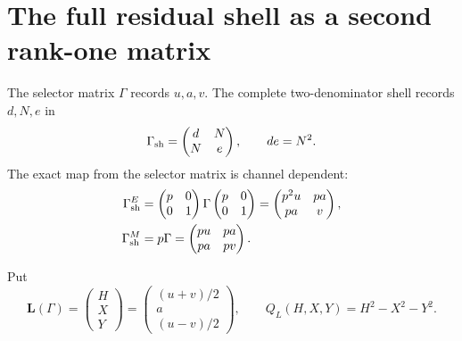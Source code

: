 \documentclass[11pt]{article}
\theoremstyle{definition}
\theoremstyle{remark}
\begin{document}
\section{The full residual shell as a second rank-one matrix}

The selector matrix $\Gamma$ records $u,a,v$.  The complete two-denominator
shell records $d,N,e$ in
\begin{equation}\label{eq:shell-matrix}
 \Gamma_{\rm sh}=\begin{pmatrix}d&N\\N&e\end{pmatrix},
 \qquad de=N^2.
\end{equation}
The exact map from the selector matrix is channel dependent:
\begin{align}
 \Gamma_{\rm sh}^{E}
 &=\begin{pmatrix}p&0\\0&1\end{pmatrix}
   \Gamma
   \begin{pmatrix}p&0\\0&1\end{pmatrix}
 =\begin{pmatrix}p^2u&pa\\pa&v\end{pmatrix},
 \label{eq:shell-E}\\
 \Gamma_{\rm sh}^{M}
 &=p\Gamma
 =\begin{pmatrix}pu&pa\\pa&pv\end{pmatrix}.
 \label{eq:shell-M}
\end{align}

Put
\begin{equation}\label{eq:selector-lorentz-vector}
 \mathbf L(\Gamma)=
 \begin{pmatrix}H\\X\\Y\end{pmatrix}
 =\begin{pmatrix}(u+v)/2\\a\\(u-v)/2\end{pmatrix},
 \qquad
 Q_L(H,X,Y)=H^2-X^2-Y^2.
\end{equation}
\end{document}
